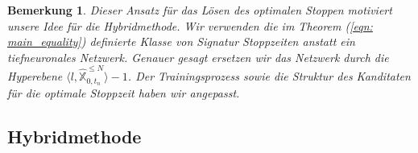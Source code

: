 \documentclass[12pt,titlepage,headsepline]{article}
\newtheorem*{bemerkung*}{Bemerkung}
\begin{document}
      \begin{bemerkung*}
        \textup{
        Dieser Ansatz für das Lösen des optimalen Stoppen motiviert unsere Idee für die Hybridmethode. Wir verwenden die im Theorem (\ref{eqn: main_equality}) definierte Klasse von Signatur Stoppzeiten anstatt ein tiefneuronales Netzwerk. Genauer gesagt ersetzen wir das Netzwerk durch die Hyperebene $\langle l, \hat{\mathbb{X}}^{\leq N}_{0,t_n} \rangle - 1$. Der Trainingsprozess sowie die Struktur des Kanditaten für die optimale Stoppzeit haben wir angepasst.
        }
      \end{bemerkung*}
      \newpage

      \subsection{Hybridmethode}
\end{document}
